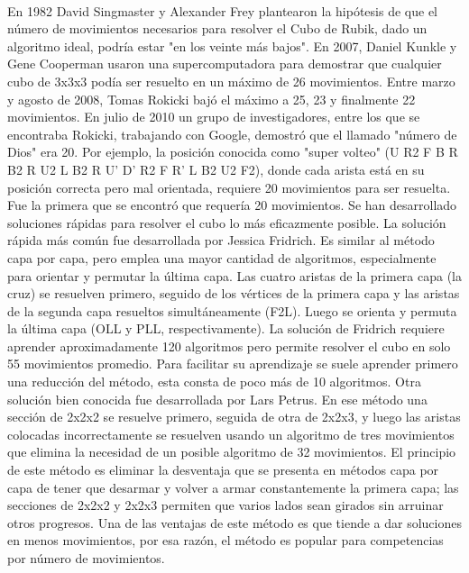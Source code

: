 \documentclass[12pt, letterpaper]{article}
\begin{document}
\paragraph{}
En 1982 David Singmaster y Alexander Frey plantearon la hipótesis de que el número de movimientos necesarios para resolver el Cubo de Rubik, dado un algoritmo ideal, podría estar "en los veinte más bajos". En 2007, Daniel Kunkle y Gene Cooperman usaron una supercomputadora para demostrar que cualquier cubo de 3x3x3 podía ser resuelto en un máximo de 26 movimientos. Entre marzo y agosto de 2008, Tomas Rokicki bajó el máximo a 25, 23 y finalmente 22 movimientos. En julio de 2010 un grupo de investigadores, entre los que se encontraba Rokicki, trabajando con Google, demostró que el llamado "número de Dios" era 20. Por ejemplo, la posición conocida como "super volteo" (U R2 F B R B2 R U2 L B2 R U' D' R2 F R' L B2 U2 F2), donde cada arista está en su posición correcta pero mal orientada, requiere 20 movimientos para ser resuelta. Fue la primera que se encontró que requería 20 movimientos.
Se han desarrollado soluciones rápidas para resolver el cubo lo más eficazmente posible. La solución rápida más común fue desarrollada por Jessica Fridrich. Es similar al método capa por capa, pero emplea una mayor cantidad de algoritmos, especialmente para orientar y permutar la última capa. Las cuatro aristas de la primera capa (la cruz) se resuelven primero, seguido de los vértices de la primera capa y las aristas de la segunda capa resueltos simultáneamente (F2L). Luego se orienta y permuta la última capa (OLL y PLL, respectivamente). La solución de Fridrich requiere aprender aproximadamente 120 algoritmos pero permite resolver el cubo en solo 55 movimientos promedio. Para facilitar su aprendizaje se suele aprender primero una reducción del método, esta consta de poco más de 10 algoritmos. Otra solución bien conocida fue desarrollada por Lars Petrus. En ese método una sección de 2x2x2 se resuelve primero, seguida de otra de 2x2x3, y luego las aristas colocadas incorrectamente se resuelven usando un algoritmo de tres movimientos que elimina la necesidad de un posible algoritmo de 32 movimientos. El principio de este método es eliminar la desventaja que se presenta en métodos capa por capa de tener que desarmar y volver a armar constantemente la primera capa; las secciones de 2x2x2 y 2x2x3 permiten que varios lados sean girados sin arruinar otros progresos. Una de las ventajas de este método es que tiende a dar soluciones en menos movimientos, por esa razón, el método es popular para competencias por número de movimientos.
\end{document}

